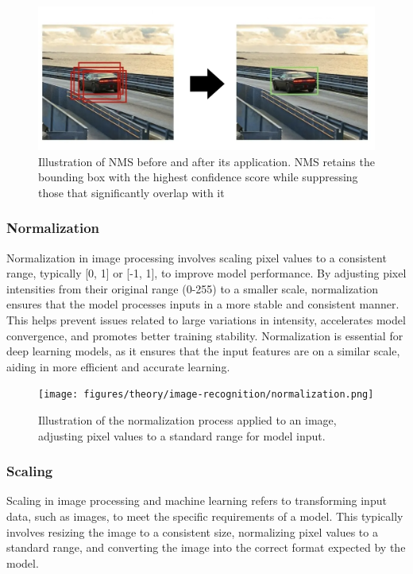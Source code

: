 \begin{figure}[h!]
    \centering
    \includegraphics[width=0.75\linewidth]{figures/theory/image-recognition/nms.png}
    \caption[Non-maximum suppression (NMS) before and after applying the algorithm]{Illustration of NMS before and after its application. NMS retains the bounding box with the highest confidence score while suppressing those that significantly overlap with it \cite{thepythoncode:nms}}
    \label{fig:nms}
\end{figure}

\subsubsection*{Normalization}

Normalization in image processing involves scaling pixel values to a consistent range, typically [0, 1] or [-1, 1], to improve model performance. By adjusting pixel intensities from their original range (0-255) to a smaller scale, normalization ensures that the model processes inputs in a more stable and consistent manner. This helps prevent issues related to large variations in intensity, accelerates model convergence, and promotes better training stability. Normalization is essential for deep learning models, as it ensures that the input features are on a similar scale, aiding in more efficient and accurate learning.

\begin{figure}[h!] \centering \texttt{[image: figures/theory/image-recognition/normalization.png]} \caption[Normalization process in image preprocessing]{Illustration of the normalization process applied to an image, adjusting pixel values to a standard range for model input.} \label{fig:normalization} \end{figure}

\subsubsection*{Scaling}

Scaling in image processing and machine learning refers to transforming input data, such as images, to meet the specific requirements of a model. This typically involves resizing the image to a consistent size, normalizing pixel values to a standard range, and converting the image into the correct format expected by the model.

